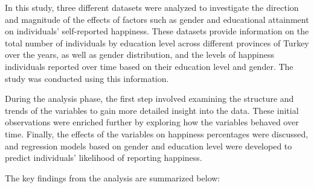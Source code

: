 \documentclass[
  11pt,
  a4paper,
  DIV=11,
  numbers=noendperiod]{scrartcl}
\begin{document}
In this study, three different datasets were analyzed to investigate the
direction and magnitude of the effects of factors such as gender and
educational attainment on individuals' self-reported happiness. These
datasets provide information on the total number of individuals by
education level across different provinces of Turkey over the years, as
well as gender distribution, and the levels of happiness individuals
reported over time based on their education level and gender. The study
was conducted using this information.

During the analysis phase, the first step involved examining the
structure and trends of the variables to gain more detailed insight into
the data. These initial observations were enriched further by exploring
how the variables behaved over time. Finally, the effects of the
variables on happiness percentages were discussed, and regression models
based on gender and education level were developed to predict
individuals' likelihood of reporting happiness.

The key findings from the analysis are summarized below:
\end{document}
